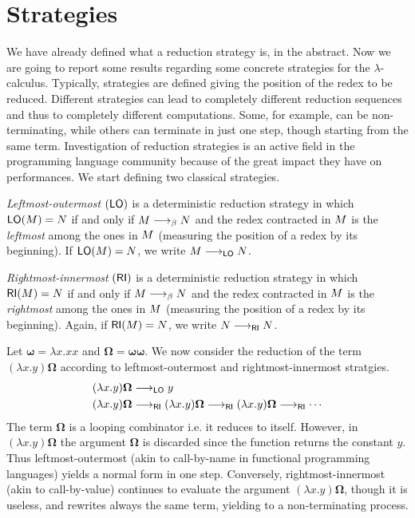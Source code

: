 \section{Strategies}
We have already defined what a reduction strategy is, in the abstract. Now we are going to report some results regarding some concrete strategies for the $\lambda$-calculus. Typically, strategies are defined giving the position of the redex to be reduced. Different strategies can lead to completely different reduction sequences and thus to completely different computations. Some, for example, can be non-terminating, while others can terminate in just one step, though starting from the same term. Investigation of reduction strategies is an active field in the programming language community because of the great impact they have on performances. We start defining two classical strategies.
\begin{definition}
	\emph{Leftmost-outermost} $(\textsf{LO})$ is a deterministic reduction
	strategy in which $\textsf{LO}(M)=N$ if and only if
	$M\longrightarrow_\beta N$ and the redex contracted in $M$ is
	the \emph{leftmost} among the ones in $M$ (measuring the
	position of a redex by its beginning). If $\textsf{LO}(M)=N$,
	we write $M\longrightarrow_{\textsf{LO}}N$.
\end{definition}
\begin{definition}
	\emph{Rightmost-innermost} $(\textsf{RI})$ is a deterministic reduction
	strategy in which $\textsf{RI}(M)=N$ if and only if
	$M\longrightarrow_\beta N$ and the redex contracted in $M$ is
	the \emph{rightmost} among the ones in $M$ (measuring the
	position of a redex by its beginning). Again, if
	$\textsf{RI}(M)=N$, we write $N\longrightarrow_{\textsf{RI}}N$.
\end{definition}
\begin{example}\label{example:canc}
	Let $\bm{\omega}=\lambda x.xx$ and
	$\bm{\Omega}=\bm{\omega\omega}$. We now consider the reduction of
	the term $(\lambda x.y)\bm{\Omega}$ according to leftmost-outermost and
	rightmost-innermost stratgies.
	\begin{align*}
		(\lambda x.y)\bm{\Omega}&\longrightarrow_{\textsf{LO}} y\\
		(\lambda x.y)\bm{\Omega}&\longrightarrow_{\textsf{RI}}(\lambda x.y)\bm{\Omega}\longrightarrow_{\textsf{RI}}(\lambda x.y)\bm{\Omega}\longrightarrow_{\textsf{RI}}\cdots
	\end{align*}
	The term $\bm{\Omega}$ is a looping combinator i.e. it reduces to
	itself. However, in $(\lambda x.y)\bm{\Omega}$ the argument
	$\bm{\Omega}$ is discarded since the function returns the constant
	$y$. Thus leftmost-outermost (akin to call-by-name in functional
	programming languages) yields a normal form in one step. Conversely,
	rightmost-innermost (akin to call-by-value) continues to evaluate
	the argument $(\lambda x.y)\bm{\Omega}$, though it is useless, and
	rewrites always the same term, yielding to a non-terminating
	process.
\end{example}

